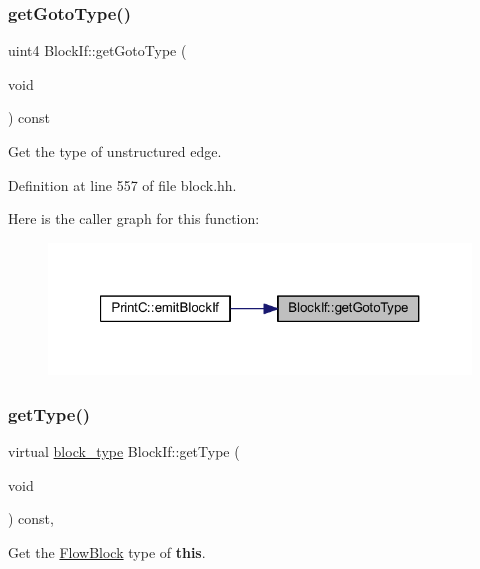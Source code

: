 \subsubsection{\texorpdfstring{getGotoType()}{getGotoType()}}
{\footnotesize\ttfamily uint4 Block\+If\+::get\+Goto\+Type (\begin{DoxyParamCaption}\item[{void}]{ }\end{DoxyParamCaption}) const\hspace{0.3cm}{\ttfamily [inline]}}



Get the type of unstructured edge. 



Definition at line 557 of file block.\+hh.

Here is the caller graph for this function\+:
\nopagebreak
\begin{figure}[H]
\begin{center}
\leavevmode
\includegraphics[width=321pt]{class_block_if_ad40f9c4fe01ab64decea6915bf674442_icgraph}
\end{center}
\end{figure}
\mbox{\label{class_block_if_a6fb92878f6e42112610ac0dee44c63a9}} 
\subsubsection{\texorpdfstring{getType()}{getType()}}
{\footnotesize\ttfamily virtual \mbox{\hyperlink{class_flow_block_a70df78390870fcdd51e31426ba6a193e}{block\+\_\+type}} Block\+If\+::get\+Type (\begin{DoxyParamCaption}\item[{void}]{ }\end{DoxyParamCaption}) const\hspace{0.3cm}{\ttfamily [inline]}, {\ttfamily [virtual]}}



Get the \mbox{\hyperlink{class_flow_block}{Flow\+Block}} type of {\bfseries{this}}. 



